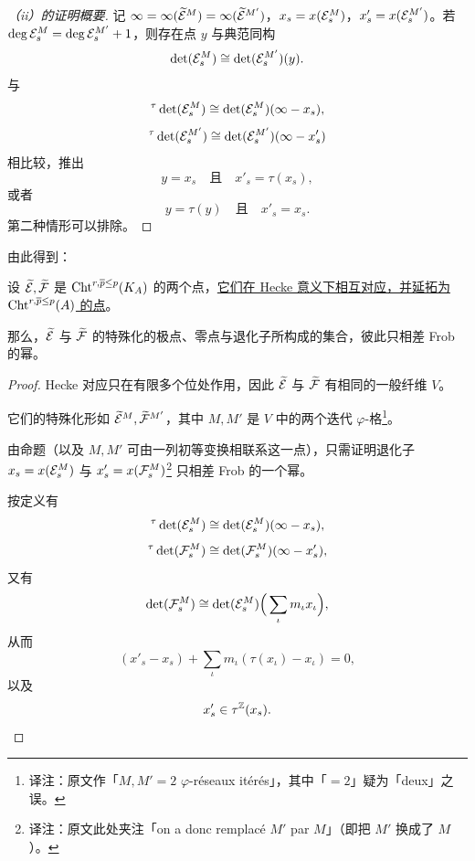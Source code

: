 \begin{proof}[（ii）的证明概要]
记 $\infty=\infty(\widetilde{\mathcal{E}}^M)=\infty(\widetilde{\mathcal{E}}^{M'})$，$x_s=x(\mathcal{E}_s^M)$，$x'_s=x(\mathcal{E}_s^{M'})$。若 $\deg\mathcal{E}_s^M=\deg\mathcal{E}_s^{M'}+1$，则存在点 $y$ 与典范同构
\[ \det(\mathcal{E}_s^M)\cong\det(\mathcal{E}_s^{M'})(y). \]
与
\[ {}^\tau\det(\mathcal{E}_s^M)\cong\det(\mathcal{E}_s^M)(\infty-x_s), \]
\[ {}^\tau\det(\mathcal{E}_s^{M'})\cong\det(\mathcal{E}_s^{M'})(\infty-x'_s) \]
相比较，推出
\[ y=x_s\quad\text{且}\quad x'_s=\tau(x_s), \]
或者
\[ y=\tau(y)\quad\text{且}\quad x'_s=x_s. \]
第二种情形可以排除。
\end{proof}

由此得到：

\begin{theorem*}[全局稳定性定理]
设 $\widetilde{\mathcal{E}},\widetilde{\mathcal{F}}$ 是 $\mathrm{Cht}^{r,\overline p\le p}(K_A)$ 的两个点，\ul{它们在 Hecke 意义下相互对应，}\allowbreak\ul{并延拓为 $\mathrm{Cht}^{r,\overline p\le p}(A)$ 的点}。

那么，$\widetilde{\mathcal{E}}$ 与 $\widetilde{\mathcal{F}}$ 的特殊化的极点、零点与退化子所构成的集合，彼此只相差 Frob 的幂。
\end{theorem*}

\begin{proof}
Hecke 对应只在有限多个位处作用，因此 $\widetilde{\mathcal{E}}$ 与 $\widetilde{\mathcal{F}}$ 有相同的一般纤维 $V$。

它们的特殊化形如 $\widetilde{\mathcal{E}}^M,\widetilde{\mathcal{F}}^{M'}$，其中 $M,M'$ 是 $V$ 中的两个迭代 $\varphi$-格\footnote{译注：原文作「$M,M'=2$ $\varphi$-réseaux itérés」，其中「$=2$」疑为「deux」之误。}。

由命题（以及 $M,M'$ 可由一列初等变换相联系这一点），只需证明退化子 $x_s=x(\mathcal{E}_s^M)$ 与 $x'_s=x(\mathcal{F}_s^M)$\footnote{译注：原文此处夹注「on a donc remplacé $M'$ par $M$」（即把 $M'$ 换成了 $M$）。} 只相差 Frob 的一个幂。

按定义有
\[ {}^\tau\det(\mathcal{E}_s^M)\cong\det(\mathcal{E}_s^M)(\infty-x_s), \]
\[ {}^\tau\det(\mathcal{F}_s^M)\cong\det(\mathcal{F}_s^M)(\infty-x'_s), \]
又有
\[ \det(\mathcal{F}_s^M)\cong\det(\mathcal{E}_s^M)\Big( \sum_\iota m_\iota x_\iota \Big), \]
从而
\[ (x'_s-x_s)+\sum_\iota m_\iota(\tau(x_\iota)-x_\iota)=0, \]
以及
\[ x'_s\in\tau^{\mathbb{Z}}(x_s). \]
\end{proof}
